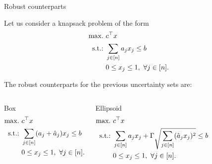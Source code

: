 \begin{frame}{Robust counterparts}

	Let us consider a knapsack problem of the form
	\begin{equation*}
	\begin{aligned}
		\mathop{\text{max.} \ } & c^\top x \\		
		\text{s.t.:~} & \sum_{j \in [n]} a_j x_j \le b \\
		& 0 \le x_j \le 1, \ \forall j \in [n].
	\end{aligned}
	\end{equation*}
	
	\pause
	The \alert{robust counterparts} for the previous uncertainty sets are:
	\begin{columns}
		\begin{block}{Box}
			\vspace{-12pt}
			\begin{equation*}
			\begin{aligned}
				\mathop{\text{max.} \ } & c^\top x \\		
				\mathop{\text{s.t.:} \ } & \sum_{j \in [n]} (a_j + \hat{a}_{j})x_j \le b \\
				& 0 \le x_j \le 1, \ \forall j \in [n].
			\end{aligned}
			\end{equation*}
		\end{block}
		\begin{block}{Ellipsoid}
			\vspace{-12pt}
			\begin{equation*}
			\begin{aligned}
				\mathop{\text{max.} \ } & c^\top x \\		
				\mathop{\text{s.t.:} \ } & \sum_{j \in [n]} a_j x_j + \Gamma\sqrt{\sum_{j \in [n]} (\hat{a}_j x_j)^2} \le b \\
				& 0 \le x_j \le 1, \ \forall j \in [n].
			\end{aligned}
			\end{equation*}
		\end{block}
	\end{columns}

\end{frame}


